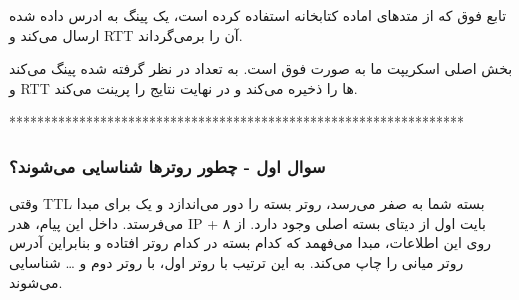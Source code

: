 {
}

تابع فوق که از متد‌های اماده کتابخانه
استفاده کرده است، یک پینگ به ادرس داده شده ارسال می‌کند و RTT آن را برمی‌گرداند.


{
}

بخش اصلی اسکریپت ما به صورت فوق است. به تعداد در نظر گرفته شده پینگ می‌کند و RTT ها را ذخیره می‌کند و در نهایت نتایج را پرینت می‌کند.

\pagebreak




*****************************************************************


\subsubsection*{سوال اول - چطور روترها شناسایی می‌شوند؟}

وقتی TTL بسته شما به صفر می‌رسد، روتر بسته را دور می‌اندازد و یک
 برای مبدا می‌فرستد. داخل این پیام، هدر IP + ۸ بایت اول
از دیتای بسته اصلی وجود دارد. از روی این اطلاعات، مبدا می‌فهمد که کدام بسته در کدام روتر افتاده و بنابراین
آدرس روتر میانی را چاپ می‌کند. به این ترتیب با  روتر اول، با 
روتر دوم و … شناسایی می‌شوند.

